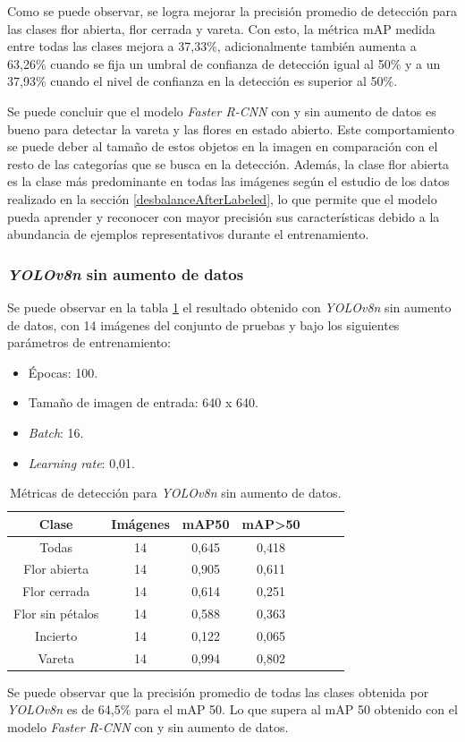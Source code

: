 Como se puede observar, se logra mejorar la precisión promedio de detección para las clases flor abierta, flor cerrada y vareta. Con esto, la métrica mAP medida entre todas las clases mejora a 37,33\%, adicionalmente también aumenta a 63,26\% cuando se fija un umbral de confianza de detección igual al 50\% y a un 37,93\% cuando el nivel de confianza en la detección es superior al 50\%.

Se puede concluir que el modelo \textit{Faster R-CNN} con y sin aumento de datos es bueno para detectar la vareta y las flores en estado abierto. Este comportamiento se puede deber al tamaño de estos objetos en la imagen en comparación con el resto de las categorías que se busca en la detección. Además, la clase flor abierta es la clase más predominante en todas las imágenes según el estudio de los datos realizado en la sección \ref{desbalanceAfterLabeled}, lo que permite que el modelo pueda aprender y reconocer con mayor precisión sus características debido a la abundancia de ejemplos representativos durante el entrenamiento.

\subsubsection{\textit{YOLOv8n} sin aumento de datos}

Se puede observar en la tabla \ref{tab:resultadosYoloSinAug} el resultado obtenido con \textit{YOLOv8n} sin aumento de datos, con 14 imágenes del conjunto de pruebas y bajo los siguientes parámetros de entrenamiento:

\begin{itemize}
	\item Épocas: 100.
    \item Tamaño de imagen de entrada: 640 x 640.
    \item \textit{Batch}: 16.
    \item \textit{Learning rate}: 0,01.
\end{itemize}

\begin{table}[h]
	\centering
	\caption{Métricas de detección para \textit{YOLOv8n} sin aumento de datos.}
	\begin{tabular}{c c c c c c c}    
		\toprule
		\textbf{Clase}&\textbf{Imágenes}&\textbf{mAP50}&\textbf{mAP>50}\\
		\midrule
		Todas & 14 & 0,645 & 0,418\\
		Flor abierta & 14 & 0,905 & 0,611 \\
		Flor cerrada & 14 & 0,614 & 0,251 \\
		Flor sin pétalos & 14 & 0,588 & 0,363 \\
		Incierto & 14 & 0,122 & 0,065 \\
		Vareta & 14 & 0,994 & 0,802 \\		
		\bottomrule
		\hline
	\end{tabular}
	\label{tab:resultadosYoloSinAug}
\end{table}
\newpage
Se puede observar que la precisión promedio de todas las clases obtenida por \textit{YOLOv8n} es de 64,5\% para el mAP 50. Lo que supera al mAP 50 obtenido con el modelo \textit{Faster R-CNN} con y sin aumento de datos.

